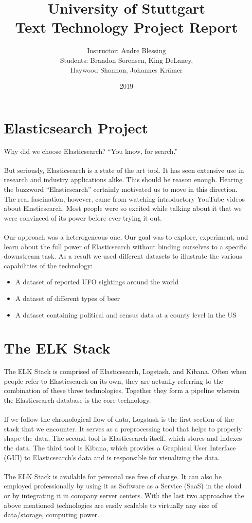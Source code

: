 \documentclass[bibliography=totoc]{article}
\title{University of Stuttgart \vspace{1em}\\Text Technology Project Report}
\author{Instructor: Andre Blessing\\Students: Brandon Sorensen, King DeLaney, \\Haywood Shannon, Johannes Krämer}
\date{2019}
\begin{document}
\maketitle
\tableofcontents

\section{Elasticsearch Project}
Why did we choose Elasticsearch? “You know, for search.”
\\
\\
But seriously, Elasticsearch is a state of the art tool. It has seen extensive use in 
research and industry applications alike. This should be reason enough. Hearing the buzzword “Elasticsearch”
certainly motivated us to move in this direction. The real fascination, however, came from watching
introductory YouTube videos about Elasticsearch. Most people were so excited while talking about it that we  were convinced of its power before ever trying it out.
\\  
\\
Our approach was a heterogeneous one. Our goal was to explore, experiment, and learn about the full power of 
Elasticsearch without binding ourselves to a specific downstream task.
As a result we used different datasets to illustrate the various capabilities of the technology:
\begin{itemize}
  \item A dataset of reported UFO sightings around the world
  \item A dataset of different types of beer
  \item A dataset containing political and census data at a county level in the US
\end{itemize}

\section{The ELK Stack}
The ELK Stack is comprised of Elasticsearch, Logstash, and Kibana.
Often when people refer to Elasticsearch on its own, they are actually referring to
the combination of these three technologies. Together they form a pipeline wherein
the Elasticsearch database is the core technology.
\\
\\
If we follow the chronological flow of data, Logstash is the first section of the
stack that we encounter. It serves as a preprocessing tool that helps to properly shape the data.
The second tool is Elasticsearch itself, which stores and indexes the data.
The third tool is Kibana, which provides a Graphical User Interface (GUI) to Elasticsearch's data 
and is responsible for visualizing the data. 
\\
\\
The ELK Stack is available for personal use free of charge. It can also be 
employed professionally by using it as Software as a Service (SaaS) in the cloud
or by integrating it in company server centers. With the last two approaches 
the above mentioned technologies are easily scalable to virtually any size of data/storage,
computing power.
\end{document}
